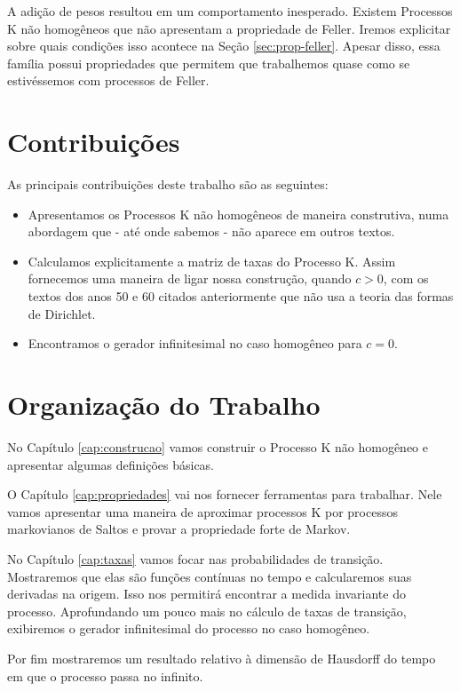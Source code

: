 A adição de pesos resultou em um comportamento inesperado. Existem
Processos K não homogêneos que não apresentam a propriedade de Feller.
Iremos explicitar sobre quais condições isso acontece na Seção
\ref{sec:prop-feller}.  Apesar disso, essa família possui propriedades
que permitem que trabalhemos quase como se estivéssemos com processos
de Feller.

\section{Contribuições}
\label{sec:contribucoes}

As principais contribuições deste trabalho são as seguintes:

\begin{itemize}

\item Apresentamos os Processos K não homogêneos de maneira
  construtiva, numa abordagem que - até onde sabemos - não aparece em
  outros textos.

\item Calculamos explicitamente a matriz de taxas do Processo K. Assim
  fornecemos uma maneira de ligar nossa construção, quando $c > 0$,
  com os textos dos anos 50 e 60 citados anteriormente que não usa a
  teoria das formas de Dirichlet.

\item Encontramos o gerador infinitesimal no caso homogêneo para $c =
  0$.

\end{itemize}

\section{Organização do Trabalho}
\label{sec:organizacao_trabalho}

No Capítulo \ref{cap:construcao} vamos construir o Processo K não
homogêneo e apresentar algumas definições básicas.

O Capítulo \ref{cap:propriedades} vai nos fornecer ferramentas para
trabalhar. Nele vamos apresentar uma maneira de aproximar processos K por
processos markovianos de Saltos e provar a propriedade forte de
Markov.

No Capítulo \ref{cap:taxas} vamos focar nas probabilidades de
transição. Mostraremos que elas são funções contínuas no tempo e
calcularemos suas derivadas na origem. Isso nos permitirá encontrar a
medida invariante do processo.  Aprofundando um pouco mais no cálculo
de taxas de transição, exibiremos o gerador infinitesimal do processo
no caso homogêneo.

Por fim mostraremos um resultado relativo à dimensão de Hausdorff do
tempo em que o processo passa no infinito.


